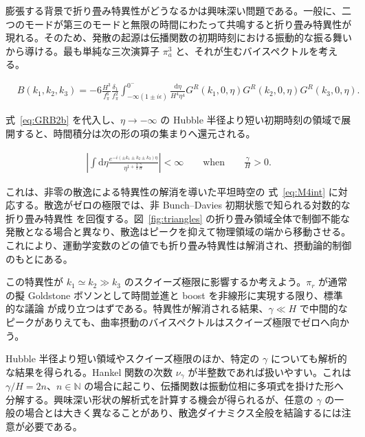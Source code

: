 \documentclass[a4paper,11pt]{ltjsarticle}
\numberwithin{equation}{section}
\def\pia{\pi_{a}}
\def\pir{\pi_{r}}
\newcommand{\dd}{\mathrm{d}}
\newcommand{\ee}{e}
\newcommand{\Eq}[1]{Eq.~(\ref{#1})}
\newcommand{\Fig}[1]{Fig.~{\ref{#1}}}
\renewcommand{\Eq}[1]{式~\eqref{#1}}
\renewcommand{\Fig}[1]{図~\ref{#1}}
\begin{document}
膨張する背景で折り畳み特異性がどうなるかは興味深い問題である。一般に、二つのモードが第三のモードと無限の時間にわたって共鳴すると折り畳み特異性が現れる。そのため、発散の起源は伝播関数の初期時刻における振動的な振る舞いから導ける。最も単純な三次演算子 $\pia^3$ と、それが生むバイスペクトルを考える。

\begin{align}
    &B(k_1,k_2,k_3) = - 6 \frac{H^3}{f_\pi^6} \frac{\delta_1}{f_\pi^2}  \int_{-\infty(1 \pm i \epsilon)}^{0^-} \frac{\dd \eta}{H^4\eta^{4}} G^{R}(k_1, 0, \eta) G^{R}(k_2, 0, \eta) G^R(k_3, 0, \eta). 
\end{align}

\Eq{eq:GRB2b} を代入し、$\eta\rightarrow-\infty$ の Hubble 半径より短い初期時刻の領域で展開すると、時間積分は次の形の項の集まりへ還元される。

\begin{align}
   \left| \int \dd \eta \frac{\ee^{-i \left(\pm k_1 \pm k_2 \pm k_3 \right)\eta}}{\eta^{1 + \frac{3}{2}\frac{\gamma}{H}}}   \right| < \infty \qquad \mathrm{when} \qquad \frac{\gamma}{H} >0.
\end{align}

これは、非零の散逸による特異性の解消を導いた平坦時空の \Eq{eq:M4int} に対応する。散逸がゼロの極限では、非 Bunch--Davies 初期状態で知られる対数的な折り畳み特異性 \cite{Holman:2007na,Chen:2006nt,Meerburg:2009ys,Agullo:2010ws,Ashoorioon:2010xg,Agarwal:2012mq,Ashoorioon:2013eia,Albrecht:2014aga,Green:2020whw} を回復する。\Fig{fig:triangles} の折り畳み領域全体で制御不能な発散となる場合と異なり、散逸はピークを抑えて物理領域の端から移動させる。これにより、運動学変数のどの値でも折り畳み特異性は解消され、摂動論的制御のもとにある。

この特異性が $k_1\simeq k_2\gg k_3$ のスクイーズ極限に影響するか考えよう。$\pir$ が通常の擬 Goldstone ボソンとして時間並進と boost を非線形に実現する限り、標準的な議論 \cite{Creminelli:2004yq,Cheung:2007sv,Creminelli:2012ed} が成り立つはずである。特異性が解消される結果、$\gamma\ll H$ で中間的なピークがありえても、曲率摂動のバイスペクトルはスクイーズ極限でゼロへ向かう。

Hubble 半径より短い領域やスクイーズ極限のほか、特定の $\gamma$ についても解析的な結果を得られる。Hankel 関数の次数 $\nu_\gamma$ が半整数であれば扱いやすい。これは $\gamma/H=2n$、$n\in\mathbb{N}$ の場合に起こり、伝播関数は振動位相に多項式を掛けた形へ分解する。興味深い形状の解析式を計算する機会が得られるが、任意の $\gamma$ の一般の場合とは大きく異なることがあり、散逸ダイナミクス全般を結論するには注意が必要である。
\end{document}
